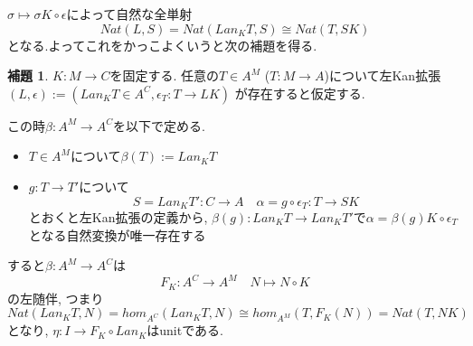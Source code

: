 \documentclass[dvipdfmx,a4paper,11pt]{article}
\theoremstyle{definition}
\newtheorem{lem}[thm]{補題}
\begin{document}
$\sigma \mapsto \sigma K \circ \epsilon $によって自然な全単射
$$
Nat (L, S)=Nat (Lan_{K}T, S) \cong Nat(T, SK)
$$
となる.よってこれをかっこよくいうと次の補題を得る. 

 \begin{tcolorbox}
 [colback = white, colframe = green!35!black, fonttitle = \bfseries,breakable = true]
\begin{lem}
\label{lem-leftkan-adjoint}
$K : M \to C$を固定する. 
任意の$T \in A^{M}$ ($T : M \to A$)について左Kan拡張
$(L, \epsilon) := (Lan_{K}T \in A^C, \epsilon_{T}: T \to LK)$
が存在すると仮定する.

この時$\beta : A^M \to A^C$を以下で定める. 
\begin{itemize}
\item $T \in A^{M}$について$\beta (T) := Lan_{K}T$
\item $g : T \to T'$について
$$
S = Lan_{K}T' : C \to A
\quad
\alpha =g\circ \epsilon_T : T \to SK 
$$
とおくと左Kan拡張の定義から, $\beta(g) : Lan_{K}T \to Lan_{K}T'$で$\alpha = \beta(g)K \circ \epsilon_T $となる自然変換が唯一存在する
\end{itemize}
すると$\beta : A^M \to A^C$は
$$
F_K : A^C \to A^M \quad N \mapsto N \circ K
$$
の左随伴, つまり
$$
Nat (Lan_{K}T, N)
=
 hom_{A^C}(Lan_{K}T, N)
 \cong
 hom_{A^M}(T, F_{K}(N)) = Nat(T,NK)
$$
となり, $\eta :  I \to F_{K}\circ Lan_{K} $はunitである. 
\end{lem}
\end{tcolorbox}
\end{document}

